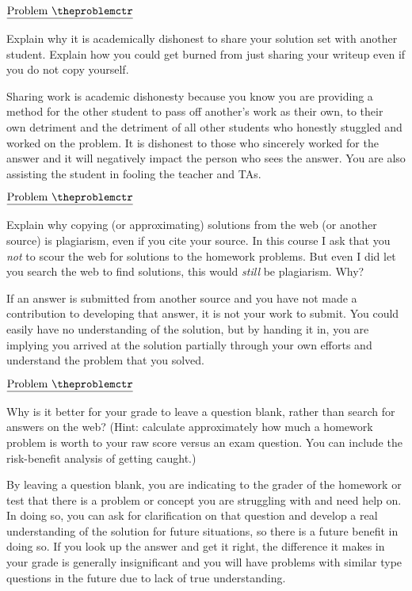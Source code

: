 \documentclass[11pt]{article}
\def\pp{\par\noindent}
\begin{document}
\addtocounter{problemctr}{1}
\bigskip
\noindent
$\underline{\rm Problem\ \theproblemctr}$\pp
%
Explain why it is academically dishonest to share your solution set
with another student.  Explain how you could get burned from just
sharing your writeup even if you do not copy yourself.

Sharing work is academic dishonesty because you know you are providing a method for the other student to pass off another's work as their own, to their own detriment and the detriment of all other students who honestly stuggled and worked on the problem. It is dishonest to those who sincerely worked for the answer and it will negatively impact the person who sees the answer. You are also assisting the student in fooling the teacher and TAs.

\addtocounter{problemctr}{1}
\bigskip
\noindent
$\underline{\rm Problem\ \theproblemctr}$\pp
%
Explain why copying (or approximating) solutions from the web (or
another source) is plagiarism, even if you cite your
source. In this course I ask that you \emph{not} to scour the
  web for solutions to the homework problems.  But even I did let you
  search the web to find solutions, this would \emph{still} be
  plagiarism.  Why?

If an answer is submitted from another source and you have not made a contribution to developing that answer, it is not your work to submit. You could easily have no understanding of the solution, but by handing it in, you are implying you arrived at the solution partially through your own efforts and understand the problem that you solved.

\addtocounter{problemctr}{1} \bigskip
\noindent
$\underline{\rm Problem\ \theproblemctr}$\pp
%
Why is it better for your grade to leave a question blank, rather than
search for answers on the web?  (Hint: calculate approximately how
much a homework problem is worth to your raw score versus an exam
question. You can include the risk-benefit analysis of getting
caught.)

By leaving a question blank, you are indicating to the grader of the homework or test that there is a problem or concept you are struggling with and need help on. In doing so, you can ask for clarification on that question and develop a real understanding of the solution for future situations, so there is a future benefit in doing so. If you look up the answer and get it right, the difference it makes in your grade is generally insignificant and you will have problems with similar type questions in the future due to lack of true understanding.
\end{document}
